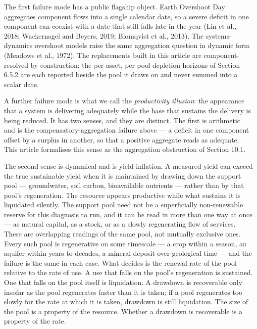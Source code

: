 \documentclass[11pt]{article}
\begin{document}
The first failure mode has a public flagship object. Earth Overshoot Day
aggregates component flows into a single calendar date, so a severe
deficit in one component can coexist with a date that still falls late
in the year (Lin et al., 2018; Wackernagel and Beyers, 2019; Blomqvist
et al., 2013). The systems-dynamics overshoot models raise the same
aggregation question in dynamic form (Meadows et al., 1972). The
replacements built in this article are component-resolved by
construction: the per-asset, per-pool depletion horizons of Section
6.5.2 are each reported beside the pool it draws on and never summed
into a scalar date.

A further failure mode is what we call the \emph{productivity illusion}:
the appearance that a system is delivering adequately while the base
that sustains the delivery is being reduced. It has two senses, and they
are distinct. The first is arithmetic and is the
compensatory-aggregation failure above --- a deficit in one component
offset by a surplus in another, so that a positive aggregate reads as
adequate. This article formalises this sense as the aggregation
obstruction of Section 10.1.

The second sense is dynamical and is yield inflation. A measured yield
can exceed the true sustainable yield when it is maintained by drawing
down the support pool --- groundwater, soil carbon, bioavailable
nutrients --- rather than by that pool's regeneration. The resource
appears productive while what sustains it is liquidated silently. The
support pool need not be a superficially non-renewable reserve for this
diagnosis to run, and it can be read in more than one way at once --- as
natural capital, as a stock, or as a slowly regenerating flow of
services. These are overlapping readings of the same pool, not mutually
exclusive ones. Every such pool is regenerative on some timescale --- a
crop within a season, an aquifer within years to decades, a mineral
deposit over geological time --- and the failure is the same in each
case. What decides is the renewal rate of the pool relative to the rate
of use. A use that falls on the pool's regeneration is sustained. One
that falls on the pool itself is liquidation. A drawdown is recoverable
only insofar as the pool regenerates faster than it is taken; if a pool
regenerates too slowly for the rate at which it is taken, drawdown is
still liquidation. The size of the pool is a property of the resource.
Whether a drawdown is recoverable is a property of the rate.
\end{document}
